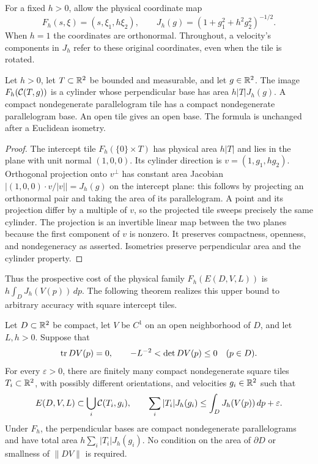 For a fixed $h>0$, allow the physical coordinate map
\[
 F_h(s,\xi)=(s,\xi_1,h\xi_2),\qquad
 J_h(g)=(1+g_1^2+h^2g_2^2)^{-1/2}.
\]
When $h=1$ the coordinates are orthonormal.
Throughout, a velocity's components in $J_h$ refer to these original
coordinates, even when the tile is rotated.

\begin{proposition}\label{b:projection}
Let $h>0$, let $T\subset\mathbb R^2$ be bounded and measurable, and let
$g\in\mathbb R^2$. The image $F_h(\mathcal C(T,g))$ is a cylinder whose perpendicular
base has area $h|T|J_h(g)$. A compact nondegenerate parallelogram tile
has a compact nondegenerate parallelogram base. An open tile gives an
open base. The formula is unchanged after a Euclidean isometry.
\end{proposition}
\begin{proof}
The intercept tile $F_h(\{0\}\times T)$ has physical area $h|T|$ and
lies in the plane with unit normal $(1,0,0)$. Its cylinder direction is
$v=(1,g_1,hg_2)$. Orthogonal projection onto $v^\perp$ has constant area
Jacobian $|(1,0,0)\cdot v/|v||=J_h(g)$ on the intercept plane: this follows
by projecting an orthonormal pair and taking the area of its parallelogram.
A point and its projection differ by a multiple of $v$, so the projected
tile sweeps precisely the same cylinder. The projection is an invertible
linear map between the two planes because the first component of $v$ is
nonzero. It preserves compactness, openness, and nondegeneracy as asserted.
Isometries preserve perpendicular area and the cylinder property.
\end{proof}

Thus the prospective cost of the physical family $F_h(E(D,V,L))$ is
$h\int_D J_h(V(p))\,dp$. The following theorem realizes this upper
bound to arbitrary accuracy with square intercept tiles.

\begin{theorem}\label{b:approximation}
Let $D\subset\mathbb R^2$ be compact, let $V$ be $C^1$ on an open
neighborhood of $D$, and let $L,h>0$. Suppose that
\begin{equation}\label{b:main-condition}
 \operatorname{tr} DV(p)=0,\qquad -L^{-2}<\det DV(p)\le0
 \quad(p\in D).
\end{equation}
For every $\varepsilon>0$, there are finitely many compact
nondegenerate square tiles $T_i\subset\mathbb R^2$, with possibly different
orientations, and velocities $g_i\in\mathbb R^2$ such that
\begin{equation}\label{b:main-cover}
 E(D,V,L)\subset\bigcup_i\mathcal C(T_i,g_i),\qquad
 \sum_i |T_i|J_h(g_i)
 \le\int_D J_h(V(p))\,dp+\varepsilon.
\end{equation}
Under $F_h$, the perpendicular bases are compact nondegenerate
parallelograms and have total area $h\sum_i|T_i|J_h(g_i)$.
No condition on the area of $\partial D$ or smallness of $\|DV\|$
is required.
\end{theorem}


